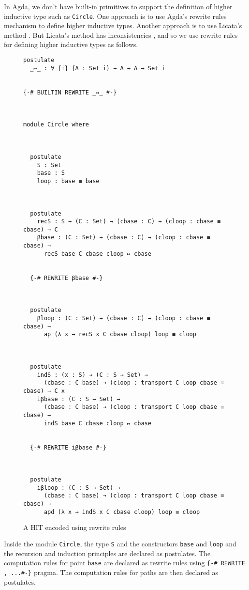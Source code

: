 \documentclass[runningheads]{llncs}
\begin{document}
In Agda, we don't have built-in primitives to support the definition of higher inductive type such as {\tt Circle}. One approach is to use Agda's rewrite rules~\cite{Cockx16} mechanism to define higher inductive types. Another approach is to use Licata's method \cite{Licata-2011}. But Licata's method has inconsistencies \cite{Licata-2011}, and so we use rewrite rules for defining higher inductive types as follows. 

\begin{figure}
\begin{center}
\begingroup
\fontsize{7.9pt}{2pt}\selectfont
\begin{Verbatim}
postulate
  _↦_ : ∀ {i} {A : Set i} → A → A → Set i


{-# BUILTIN REWRITE _↦_ #-}



module Circle where



  postulate
    S : Set
    base : S
    loop : base ≡ base



  postulate
    recS : S → (C : Set) → (cbase : C) → (cloop : cbase ≡ cbase) → C
    βbase : (C : Set) → (cbase : C) → (cloop : cbase ≡ cbase) → 
      recS base C cbase cloop ↦ cbase


  {-# REWRITE βbase #-}



  postulate
    βloop : (C : Set) → (cbase : C) → (cloop : cbase ≡ cbase) → 
      ap (λ x → recS x C cbase cloop) loop ≡ cloop



  postulate
    indS : (x : S) → (C : S → Set) → 
      (cbase : C base) → (cloop : transport C loop cbase ≡ cbase) → C x
    iβbase : (C : S → Set) → 
      (cbase : C base) → (cloop : transport C loop cbase ≡ cbase) → 
      indS base C cbase cloop ↦ cbase


  {-# REWRITE iβbase #-}



  postulate
    iβloop : (C : S → Set) → 
      (cbase : C base) → (cloop : transport C loop cbase ≡ cbase) → 
      apd (λ x → indS x C cbase cloop) loop ≡ cloop
\end{Verbatim}
\endgroup
\end{center}
\caption{A HIT encoded using rewrite rules}
\label{fig:circle-hit}
\end{figure}
\normalsize

Inside the module {\tt Circle}, the type {\tt S} and the constructors {\tt base} and {\tt loop} and the recursion and induction principles are declared as postulates. The computation rules for point {\tt base} are declared as rewrite rules using \Verb|{-# REWRITE , ...#-}| pragma. The computation rules for paths are then declared as postulates.
\end{document}

